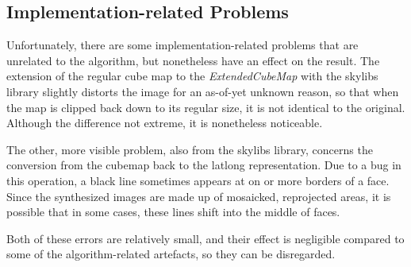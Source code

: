 \subsection{Implementation-related Problems}
Unfortunately, there are some implementation-related problems that are unrelated to the algorithm, but nonetheless have an effect on the result. The extension of the regular cube map to the \emph{ExtendedCubeMap} with the skylibs library slightly distorts the image for an as-of-yet unknown reason, so that when the map is clipped back down to its regular size, it is not identical to the original. Although the difference not extreme, it is nonetheless noticeable.

The other, more visible problem, also from the skylibs library, concerns the conversion from the cubemap back to the latlong representation. Due to a bug in this operation, a black line sometimes appears at on or more borders of a face. Since the synthesized images are made up of mosaicked, reprojected areas, it is possible that in some cases, these lines shift into the middle of faces.

Both of these errors are relatively small, and their effect is negligible compared to some of the algorithm-related artefacts, so they can be disregarded.
